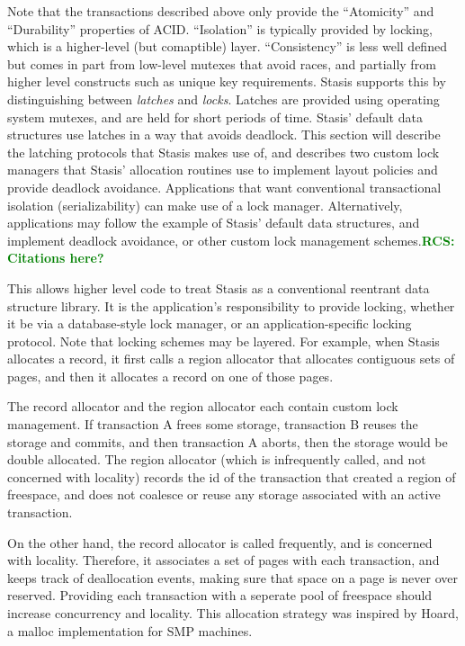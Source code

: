 \documentclass[letterpaper,twocolumn,10pt]{article}
\newcommand{\yad}{Stasis\xspace}
\newcommand{\yads}{Stasis'\xspace}
\newcommand{\rcs}[1]{\textcolor{green}{\bf RCS: #1}}
\begin{document}
Note that the transactions described above only provide the
``Atomicity'' and ``Durability'' properties of ACID.  ``Isolation'' is
typically provided by locking, which is a higher-level (but
comaptible) layer.  ``Consistency'' is less well defined but comes in
part from low-level mutexes that avoid races, and partially from
higher level constructs such as unique key requirements.  \yad
supports this by distinguishing between {\em latches} and {\em locks}.
Latches are provided using operating system mutexes, and are held for
short periods of time.  \yads default data structures use latches in a
way that avoids deadlock.  This section will describe the latching
protocols that \yad makes use of, and describes two custom lock
managers that \yads allocation routines use to implement layout 
policies and provide deadlock avoidance.  Applications that want
conventional transactional isolation (serializability) can make 
use of a lock manager.  Alternatively, applications may follow 
the example of \yads default data structures, and implement 
deadlock avoidance, or other custom lock management schemes.\rcs{Citations here?}

This allows higher level code to treat \yad as a conventional
reentrant data structure library.  It is the application's
responsibility to provide locking, whether it be via a database-style
lock manager, or an application-specific locking protocol.  Note that
locking schemes may be layered.  For example, when \yad allocates a
record, it first calls a region allocator that allocates contiguous
sets of pages, and then it allocates a record on one of those pages.

The record allocator and the region allocator each contain custom lock
management.  If transaction A frees some storage, transaction B reuses
the storage and commits, and then transaction A aborts, then the
storage would be double allocated.  The region allocator (which is
infrequently called, and not concerned with locality) records the id
of the transaction that created a region of freespace, and does not
coalesce or reuse any storage associated with an active transaction.

On the other hand, the record allocator is called frequently, and is
concerned with locality.  Therefore, it associates a set of pages with
each transaction, and keeps track of deallocation events, making sure
that space on a page is never over reserved.  Providing each
transaction with a seperate pool of freespace should increase
concurrency and locality.  This allocation strategy was inspired by
Hoard, a malloc implementation for SMP machines.
\end{document}

